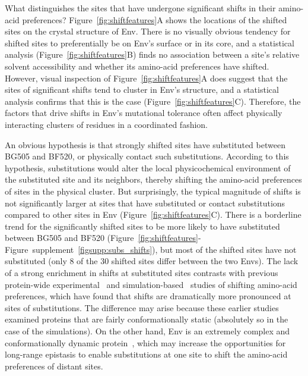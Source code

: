 \documentclass[9pt]{elife}
\begin{document}
What distinguishes the sites that have undergone significant shifts in their amino-acid preferences?
Figure~\ref{fig:shiftfeatures}A shows the locations of the shifted sites on the crystal structure of Env.
There is no visually obvious tendency for shifted sites to preferentially be on Env's surface or in its core, and a statistical analysis (Figure~\ref{fig:shiftfeatures}B) finds no association between a site's relative solvent accessibility and whether its amino-acid preferences have shifted.
However, visual inspection of Figure~\ref{fig:shiftfeatures}A does suggest that the sites of significant shifts tend to cluster in Env's structure, and a statistical analysis confirms that this is the case (Figure~\ref{fig:shiftfeatures}C).
Therefore, the factors that drive shifts in Env's mutational tolerance often affect physically interacting clusters of residues in a coordinated fashion.

An obvious hypothesis is that strongly shifted sites have substituted between BG505 and BF520, or physically contact such substitutions.
According to this hypothesis, substitutions would alter the local physicochemical environment of the substituted site and its neighbors, thereby shifting the amino-acid preferences of sites in the physical cluster.
But surprisingly, the typical magnitude of shifts is not significantly larger at sites that have substituted or contact substitutions compared to other sites in Env (Figure~\ref{fig:shiftfeatures}C).
There is a borderline trend for the significantly shifted sites to be more likely to have substituted between BG505 and BF520 (Figure~\ref{fig:shiftfeatures}-Figure~supplement~\ref{figsupp:subs_shifts}), but most of the shifted sites have not substituted (only 8 of the 30 shifted sites differ between the two Envs).
The lack of a strong enrichment in shifts at substituted sites contrasts with previous protein-wide experimental~\citep{doud2015site} and simulation-based~\citep{pollock2012amino,shah2015contingency} studies of shifting amino-acid preferences, which have found that shifts are dramatically more pronounced at sites of substitutions.
The difference may arise because these earlier studies examined proteins that are fairly conformationally static (absolutely so in the case of the simulations).
On the other hand, Env is an extremely complex and conformationally dynamic protein~\citep{munro2014conformational,ozorowski2017open}, which may increase the opportunities for long-range epistasis to enable substitutions at one site to shift the amino-acid preferences of distant sites.
\end{document}
